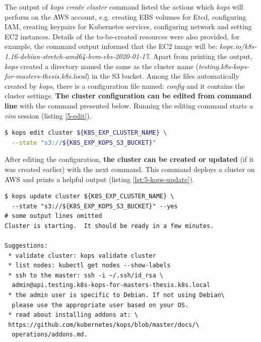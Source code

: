 The output of \textit{kops create cluster} command listed the actions which \textit{kops} will perform on the AWS account, e.g. creating EBS volumes for Etcd, configuring IAM, creating keypairs for Kubernetes services, configuring network and setting EC2 instances. Details of the to-be-created resources were also provided, for example, the command output informed that the EC2 image will be: \textit{kope.io/k8s-1.16-debian-stretch-amd64-hvm-ebs-2020-01-17}. Apart from printing the output, \textit{kops} created a directory named the same as the cluster name (\textit{testing.k8s-kops-for-masters-thesis.k8s.local}) in the S3 bucket. Among the files automatically created by \textit{kops}, there is a configuration file named: \textit{config} and it contains the cluster settings. \textbf{The cluster configuration can be edited from command line} with the command presented below. Running the editing command starts a \textit{vim} session (listing \ref{5-edit}).
\begin{lstlisting}[basicstyle=\scriptsize,xleftmargin=0cm,label=5-edit,caption={Command used to edit a Kubernetes cluster managed by \textit{kops}},captionpos=b,language=Bash]
$ kops edit cluster ${K8S_EXP_CLUSTER_NAME} \
  --state "s3://${K8S_EXP_KOPS_S3_BUCKET}"
\end{lstlisting}
After editing the configuration, \textbf{the cluster can be created or updated} (if it was created earlier) with the next command. This command deploys a cluster on AWS and prints a helpful output (listing \ref{lst:5-kops-update}).
\begin{mdframed}[linecolor=white]
\begin{lstlisting}[basicstyle=\scriptsize,xleftmargin=-0.5cm,caption={Command used to deploy a Kubernetes cluster with \textit{kops}},label=lst:5-kops-update]
$ kops update cluster ${K8S_EXP_CLUSTER_NAME} \
  --state "s3://${K8S_EXP_KOPS_S3_BUCKET}" --yes
# some output lines omitted
Cluster is starting.  It should be ready in a few minutes.

Suggestions:
 * validate cluster: kops validate cluster
 * list nodes: kubectl get nodes --show-labels
 * ssh to the master: ssh -i ~/.ssh/id_rsa \
  admin@api.testing.k8s-kops-for-masters-thesis.k8s.local
 * the admin user is specific to Debian. If not using Debian\
  please use the appropriate user based on your OS.
 * read about installing addons at: \
 https://github.com/kubernetes/kops/blob/master/docs/\
  operations/addons.md.
\end{lstlisting}
\end{mdframed}

